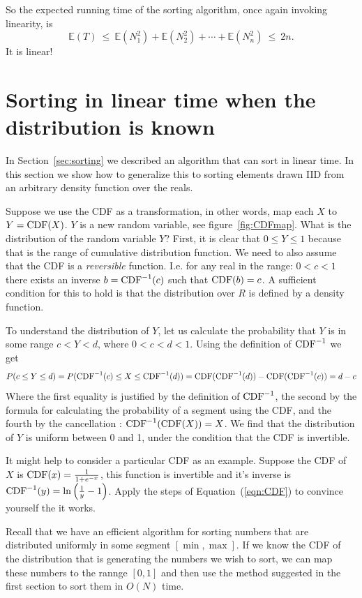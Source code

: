 \documentclass{report}
\theoremstyle{plain}
\theoremstyle{definition}
\newcommand{\E}{\mathbb{E}}
\begin{document}
So the expected running time of the sorting algorithm, once again invoking linearity, is
$$ \E(T) 
\ \leq \ \E(N_1^2) + \E(N_2^2) + \cdots + \E(N_n^2) 
\ \leq \ 2n
.$$
It is linear!

\section{Sorting in linear time when the distribution is known}

In Section~\ref{sec:sorting} we described an algorithm that can sort
in linear time. In this section we show how to generalize this to
sorting elements drawn IID from an arbitrary density function over the reals.

Suppose we use the CDF as a transformation, in other words, map each
$X$ to $Y=\mbox{CDF}(X)$. $Y$ is a new random variable, see
figure~\ref{fig:CDFmap}. What is the distribution of the random
variable $Y$? First, it is clear that $0 \leq Y \leq 1$ because that
is the range of cumulative distribution function. We need to also
assume that the CDF is a {\em reversible} function. I.e. for any real
in the range: $0<c<1$ there exists an inverse $b=\mbox{CDF}^{-1}(c)$ such
that $\mbox{CDF}(b)=c$. A sufficient condition for this to hold is that the
distribution over $R$ is defined by a density function.

To understand the distribution of $Y$, let us calculate the
probability that $Y$ is in some range $c<Y<d$, where $0<c<d<1$.
Using the definition of $\mbox{CDF}^{-1}$ we get
\begin{equation} \label{eqn:CDF}
P(c \leq Y \leq d) = P(\mbox{CDF}^{-1}(c) \leq X \leq \mbox{CDF}^{-1}(d)) =
\mbox{CDF}(\mbox{CDF}^{-1}(d))-\mbox{CDF}(\mbox{CDF}^{-1}(c)) = d-c
\end{equation}
Where the first equality is justified by the definition of
$\mbox{CDF}^{-1}$, the second by the formula for calculating the probability
of a segment using the CDF, and the fourth by the cancellation :
$\mbox{CDF}^{-1}(\mbox{CDF}(X))=X$.  We find that the distribution of $Y$ is
uniform between 0 and 1, under the condition that the CDF is invertible.

It might help to consider a particular CDF as an example. Suppose the
CDF of $X$ is $\mbox{CDF}(x) = \frac{1}{1+e^{-x}}$, this function is
invertible and it's inverse is
$\mbox{CDF}^{-1}(y)=\ln\left(\frac{1}{y}-1\right)$. Apply the steps of
Equation~(\ref{eqn:CDF}) to convince yourself the it works.

Recall that we have an efficient algorithm for sorting numbers that
are distributed uniformly in some segment $[\min,\max]$.
If we know the CDF of the distribution that is generating the
numbers we wish to sort, we can map these numbers to the rannge
$[0,1]$ and then use the method suggested in the first section to sort
them in $O(N)$ time.
\end{document}
